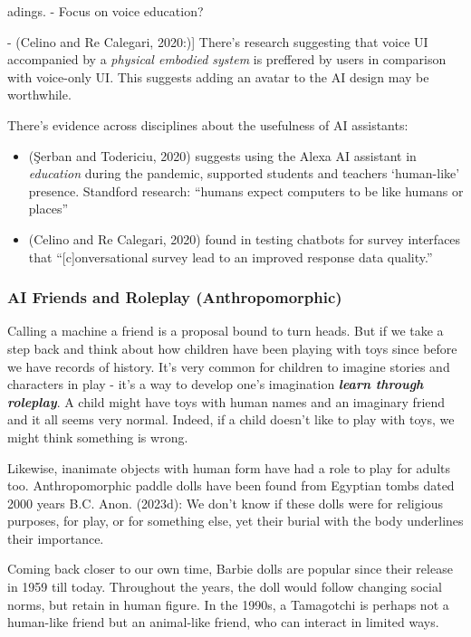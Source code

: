 \documentclass[
  letterpaper,
  DIV=11,
  numbers=noendperiod]{scrartcl}
\providecommand{\tightlist}{%
  \setlength{\itemsep}{0pt}\setlength{\parskip}{0pt}}\usepackage{longtable,booktabs,array}
\begin{document}
adings. - Focus on voice education?

- (Celino and Re Calegari, 2020:){]} There's research suggesting that
voice UI accompanied by a \emph{physical embodied system} is preffered
by users in comparison with voice-only UI. This suggests adding an
avatar to the AI design may be worthwhile.

There's evidence across disciplines about the usefulness of AI
assistants:

\begin{itemize}
\tightlist
\item
  (Şerban and Todericiu, 2020) suggests using the Alexa AI assistant in
  \emph{education} during the pandemic, supported students and teachers
  `human-like' presence. Standford research: ``humans expect computers
  to be like humans or places''
\item
  (Celino and Re Calegari, 2020) found in testing chatbots for survey
  interfaces that ``{[}c{]}onversational survey lead to an improved
  response data quality.''
\end{itemize}

\subsubsection{AI Friends and Roleplay
(Anthropomorphic)}\label{ai-friends-and-roleplay-anthropomorphic}

Calling a machine a friend is a proposal bound to turn heads. But if we
take a step back and think about how children have been playing with
toys since before we have records of history. It's very common for
children to imagine stories and characters in play - it's a way to
develop one's imagination \textbf{\emph{learn through roleplay}}. A
child might have toys with human names and an imaginary friend and it
all seems very normal. Indeed, if a child doesn't like to play with
toys, we might think something is wrong.

Likewise, inanimate objects with human form have had a role to play for
adults too. Anthropomorphic paddle dolls have been found from Egyptian
tombs dated 2000 years B.C. Anon. (2023d): We don't know if these dolls
were for religious purposes, for play, or for something else, yet their
burial with the body underlines their importance.

Coming back closer to our own time, Barbie dolls are popular since their
release in 1959 till today. Throughout the years, the doll would follow
changing social norms, but retain in human figure. In the 1990s, a
Tamagotchi is perhaps not a human-like friend but an animal-like friend,
who can interact in limited ways.
\end{document}
